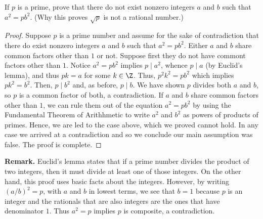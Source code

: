 \begin{questions}
\question
    If \(p\) is a prime, prove that there do not exist nonzero integers \(a\) and \(b\) such that \(a^2=p b^2\). (Why this proves  \(\sqrt{p}\) is not a rational number.)
\renewcommand{\solutiontitle}{}
    \begin{solution}%
    \vspace*{-\baselineskip}
    \begin{proof}
    Suppose \(p\) is a prime number and assume for the sake of contradiction that there do exist nonzero integers \(a\) and \(b\) such that \(a^2=p b^2\).
    Either \(a\) and \(b\) share common factors other than \(1\) or not.
%
    Suppose first they do not have commont factors other than \(1\).
    Notice \(a^2=p b^2\) implies \(p\mid a^2\), whence \(p\mid a\) (by Euclid's lemma), and thus  \(pk = a\) for some \(k\in \Z\). Thus, \(p^2k^2 = p b^2\) which implies \(p k^2 = b^2\). Then,  \(p\mid b^2\) and, as before,  \(p\mid b\). We have shown \(p\) divides both \(a\) and \(b\), so \(p\) is a common factor of both, a contradiction.
%
    If \(a\) and \(b\) share common factors other than \(1\), we can rule them out of the equation \(a^2=p b^2\) by using the Fundamental Theorem of Arithhmetic to write \(a^2\) and \(b^2\) as powers of products of primes. Hence, we are led to the case above, which we proved cannot hold. 
%
    In any case we arrived at a contradiction and so we conclude our main assumption was false. The proof is complete.
    \end{proof}

    \textbf{Remark.} Euclid's lemma states that if a prime number divides the product of two integers, then it must divide at least one of those integers. On the other hand, this proof uses basic facts about the integers. However, by writing \((a/b)^2 = p\), with \(a\) and \(b\) in lowest terms, we see that \(b=1\) because \(p\) is an integer and the rationals that are also integers are the ones that have denominator \(1\). Thus \(a^2 = p\) implies \(p\) is composite, a contradiction.
\end{solution}
\renewcommand{\solutiontitle}{\noindent\textit{Solution.} }



\end{questions}
